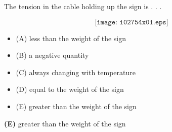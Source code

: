 

The tension in the cable holding up the sign is . . .

$$\texttt{[image: i02754x01.eps]}$$

\begin{itemize}
\item{(A)} less than the weight of the sign
\vskip 5pt 
\item{(B)} a negative quantity
\vskip 5pt 
\item{(C)} always changing with temperature
\vskip 5pt 
\item{(D)} equal to the weight of the sign
\vskip 5pt 
\item{(E)} greater than the weight of the sign
\end{itemize}







{\bf (E)} greater than the weight of the sign
 










